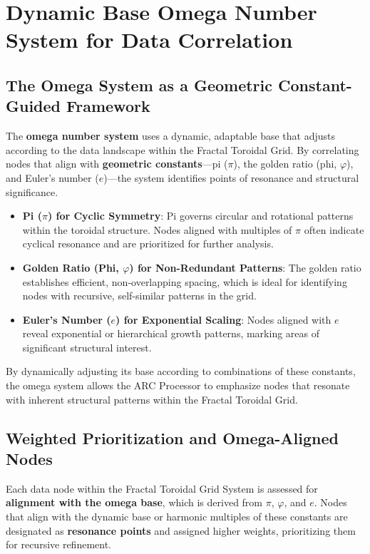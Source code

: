 \documentclass{article}
\begin{document}
\section{Dynamic Base Omega Number System for Data Correlation}

\subsection{The Omega System as a Geometric Constant-Guided Framework}

The \textbf{omega number system} uses a dynamic, adaptable base that adjusts according to the data landscape within the Fractal Toroidal Grid. By correlating nodes that align with \textbf{geometric constants}—pi ($\pi$), the golden ratio (phi, $\varphi$), and Euler’s number ($e$)—the system identifies points of resonance and structural significance.

\begin{itemize}
    \item \textbf{Pi ($\pi$) for Cyclic Symmetry}: Pi governs circular and rotational patterns within the toroidal structure. Nodes aligned with multiples of $\pi$ often indicate cyclical resonance and are prioritized for further analysis.
    \item \textbf{Golden Ratio (Phi, $\varphi$) for Non-Redundant Patterns}: The golden ratio establishes efficient, non-overlapping spacing, which is ideal for identifying nodes with recursive, self-similar patterns in the grid.
    \item \textbf{Euler’s Number ($e$) for Exponential Scaling}: Nodes aligned with $e$ reveal exponential or hierarchical growth patterns, marking areas of significant structural interest.
\end{itemize}

By dynamically adjusting its base according to combinations of these constants, the omega system allows the ARC Processor to emphasize nodes that resonate with inherent structural patterns within the Fractal Toroidal Grid.

\subsection{Weighted Prioritization and Omega-Aligned Nodes}

Each data node within the Fractal Toroidal Grid System is assessed for \textbf{alignment with the omega base}, which is derived from $\pi$, $\varphi$, and $e$. Nodes that align with the dynamic base or harmonic multiples of these constants are designated as \textbf{resonance points} and assigned higher weights, prioritizing them for recursive refinement.
\end{document}

